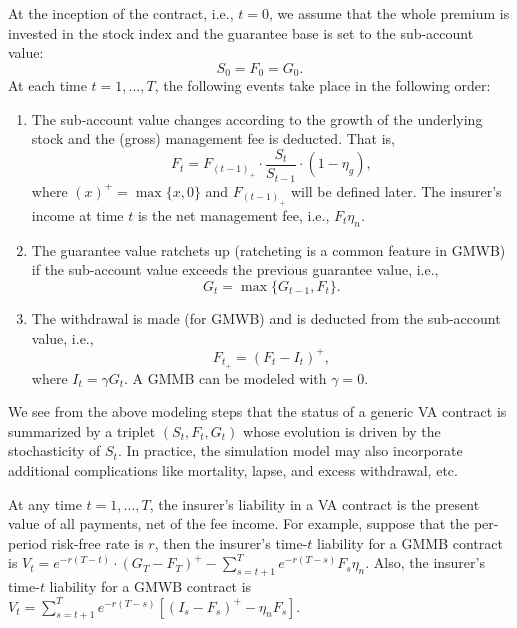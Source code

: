 \documentclass{article}
\begin{document}
At the inception of the contract, i.e., $t=0$, we assume that the whole premium is invested in the stock index and the guarantee base is set to the sub-account value:
\begin{equation*}
    S_0=F_0=G_0.
\end{equation*}
At each time $t=1,\ldots,T$, the following events take place in the following order:
\begin{enumerate}
    \item The sub-account value changes according to the growth of the underlying stock and the (gross) management fee is deducted. That is, 
        \begin{equation*}
            F_t = F_{(t-1)_+}\cdot\frac{S_{t}}{S_{t-1}}\cdot(1-\eta_g),
        \end{equation*} 
    where $(x)^+=\max\{x,0\}$ and $F_{(t-1)_+}$ will be defined later. The insurer's income at time $t$ is the net management fee, i.e., $F_t\eta_n$. 

    \item The guarantee value ratchets up (ratcheting is a common feature in GMWB) if the sub-account value exceeds the previous guarantee value, i.e., 
        \begin{equation*}
            G_t = \max\{G_{t-1},F_t\}.
        \end{equation*} 

    \item The withdrawal is made (for GMWB) and is deducted from the sub-account value, i.e., 
        \begin{equation*}
            F_{t_+} = (F_t - I_t)^+,
        \end{equation*} 
    where $I_t = \gamma G_t$. A GMMB can be modeled with $\gamma = 0$.
\end{enumerate}

We see from the above modeling steps that the status of a generic VA contract is summarized by a triplet $(S_t,F_t,G_t)$ whose evolution is driven by the stochasticity of $S_t$.
In practice, the simulation model may also incorporate additional complications like mortality, lapse, and excess withdrawal, etc.

At any time $t=1,\ldots,T$, the insurer's liability in a VA contract is the present value of all payments, net of the fee income.
For example, suppose that the per-period risk-free rate is $r$, then
the insurer's time-$t$ liability for a GMMB contract is $V_t = e^{-r(T-t)}\cdot (G_T - F_T)^+ - \sum_{s=t+1}^{T} e^{-r(T-s)} F_s \eta_n$.
Also, the insurer's time-$t$ liability for a GMWB contract is $V_t = \sum_{s=t+1}^{T} e^{-r(T-s)} [(I_s - F_s)^+- \eta_n F_s] $.
\end{document}
